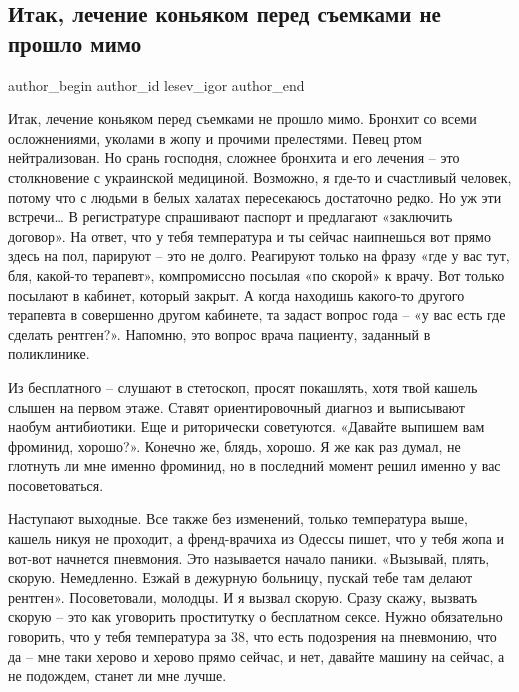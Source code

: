  
 
 
 
 
 
\subsection{Итак, лечение коньяком перед съемками не прошло мимо}
\label{sec:31_07_2018.fb.lesev_igor.1.lechenie_konjakom}
 
\ifcmt
 author_begin
   author_id lesev_igor
 author_end
\fi

Итак, лечение коньяком перед съемками не прошло мимо. Бронхит со всеми
осложнениями, уколами в жопу и прочими прелестями. Певец ртом нейтрализован. Но
срань господня, сложнее бронхита и его лечения – это столкновение с украинской
медициной. Возможно, я где-то и счастливый человек, потому что с людьми в белых
халатах пересекаюсь достаточно редко. Но уж эти встречи… В регистратуре
спрашивают паспорт и предлагают «заключить договор». На ответ, что у тебя
температура и ты сейчас наипнешься вот прямо здесь на пол, парируют – это не
долго. Реагируют только на фразу «где у вас тут, бля, какой-то терапевт»,
компромиссно посылая «по скорой» к врачу. Вот только посылают в кабинет,
который закрыт. А когда находишь какого-то другого терапевта в совершенно
другом кабинете, та задаст вопрос года – «у вас есть где сделать рентген?».
Напомню, это вопрос врача пациенту, заданный в поликлинике. 

Из бесплатного – слушают в стетоскоп, просят покашлять, хотя твой кашель слышен
на первом этаже. Ставят ориентировочный диагноз и выписывают наобум
антибиотики. Еще и риторически советуются. «Давайте выпишем вам фроминид,
хорошо?». Конечно же, блядь, хорошо. Я же как раз думал, не глотнуть ли мне
именно фроминид, но в последний момент решил именно у вас посоветоваться.

Наступают выходные. Все также без изменений, только температура выше, кашель
никуя не проходит, а френд-врачиха из Одессы пишет, что у тебя жопа и вот-вот
начнется пневмония. Это называется начало паники. «Вызывай, плять, скорую.
Немедленно. Езжай в дежурную больницу, пускай тебе там делают рентген».
Посоветовали, молодцы. И я вызвал скорую. Сразу скажу, вызвать скорую – это как
уговорить проститутку о бесплатном сексе. Нужно обязательно говорить, что у
тебя температура за 38, что есть подозрения на пневмонию, что да – мне таки
херово и херово прямо сейчас, и нет, давайте машину на сейчас, а не подождем,
станет ли мне лучше.

